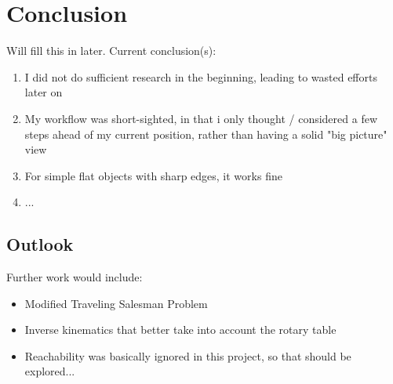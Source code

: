 \chapter{Conclusion}

Will fill this in later.
Current conclusion(s):
\begin{enumerate}
	\item I did not do sufficient research in the beginning, leading to wasted efforts later on
	\item My workflow was short-sighted, in that i only thought / considered a few steps ahead of my current position,
		rather than having a solid "big picture" view
	\item For simple flat objects with sharp edges, it works fine
	\item ...
\end{enumerate}

\section{Outlook}
Further work would include:
\begin{itemize}
	\item Modified Traveling Salesman Problem
	\item Inverse kinematics that better take into account the rotary table
	\item Reachability was basically ignored in this project, so that should be explored...	
\end{itemize}


